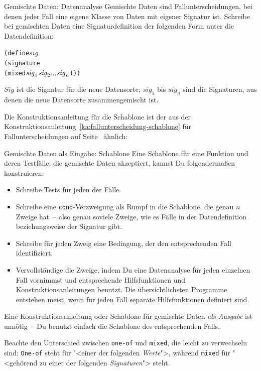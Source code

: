\begin{konstruktionsanleitung}{Gemischte Daten: Datenanalyse}
  \label{ka:gemischt-datenanalyse}
  Gemischte Daten sind Fallunterscheidungen, bei denen jeder Fall eine
  eigene Klasse von Daten mit eigener Signatur ist.
  Schreibe bei gemischten Daten eine Signaturdefinition der folgenden Form unter die
  Datendefinition:
%
\begin{alltt}
(define \(\mathit{sig}\)
  (signature
    (mixed \(\mathit{sig}\sb{1}\) \(\mathit{sig}\sb{2}\) \(\ldots\) \(\mathit{sig}\sb{n}\))))
\end{alltt}
$\mathit{Sig}$ ist die Signatur für die neue Datensorte; $\mathit{sig}_1$ bis $\textit{sig}_n$
sind die Signaturen, aus denen die neue
Datensorte zusammengemischt ist.
\end{konstruktionsanleitung}
%
\noindent Die Konstruktionsanleitung für die Schablone ist der aus
der Konstruktionsanleitung~\ref{ka:fallunterscheidung-schablone} für
Fallunterscheidungen auf
Seite~\pageref{ka:fallunterscheidung-schablone} ähnlich:
%
\begin{konstruktionsanleitung}{Gemischte Daten als Eingabe:
    Schablone}
  \label{ka:gemischt-eingabe-schablone}
Eine Schablone für eine Funktion und deren Testfälle, die gemischte
Daten akzeptiert, kannst Du folgendermaßen konstruieren:
%
\begin{itemize}
\item Schreibe Tests für jeden der Fälle.
\item  Schreibe eine \texttt{cond}-Verzweigung als Rumpf in die
  Schablone, die genau $n$ Zweige hat~-- also genau soviele Zweige,
  wie es Fälle in der Datendefinition beziehungsweise der Signatur gibt.
\item Schreibe für jeden Zweig eine Bedingung, der den entsprechenden
  Fall identifiziert.
\item Vervollständige die Zweige, indem Du eine Datenanalyse für
  jeden einzelnen Fall vornimmst und entsprechende Hilfsfunktionen
  und Konstruktionsanleitungen benutzt.
  Die übersichtlichsten Programme entstehen meist, wenn für jeden Fall
  separate Hilfsfunktionen definiert sind.\label{page:separate-mixed-procs}
\end{itemize}
%
\end{konstruktionsanleitung}
%
Eine Konstruktionsanleitung oder Schablone für gemischte Daten
\emph{als Ausgabe} ist unnötig~-- Du benutzt einfach die Schablone
des entsprechenden Falls.

Beachte den Unterschied zwischen \texttt{one-of} und
\texttt{mixed}, die leicht zu verwechseln sind: \texttt{One-of} steht
für "<einer der folgenden \emph{Werte}">, während \texttt{mixed} für
"<gehörend zu einer der folgenden \emph{Signaturen}"> steht.

